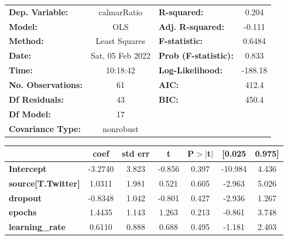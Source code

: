 \begin{center}
\begin{tabular}{lclc}
\toprule
\textbf{Dep. Variable:}                   &   calmarRatio    & \textbf{  R-squared:         } &     0.204   \\
\textbf{Model:}                           &       OLS        & \textbf{  Adj. R-squared:    } &    -0.111   \\
\textbf{Method:}                          &  Least Squares   & \textbf{  F-statistic:       } &    0.6484   \\
\textbf{Date:}                            & Sat, 05 Feb 2022 & \textbf{  Prob (F-statistic):} &    0.833    \\
\textbf{Time:}                            &     10:18:42     & \textbf{  Log-Likelihood:    } &   -188.18   \\
\textbf{No. Observations:}                &          61      & \textbf{  AIC:               } &     412.4   \\
\textbf{Df Residuals:}                    &          43      & \textbf{  BIC:               } &     450.4   \\
\textbf{Df Model:}                        &          17      & \textbf{                     } &             \\
\textbf{Covariance Type:}                 &    nonrobust     & \textbf{                     } &             \\
\bottomrule
\end{tabular}
\begin{tabular}{lcccccc}
                                          & \textbf{coef} & \textbf{std err} & \textbf{t} & \textbf{P$> |$t$|$} & \textbf{[0.025} & \textbf{0.975]}  \\
\midrule
\textbf{Intercept}                        &      -3.2740  &        3.823     &    -0.856  &         0.397        &      -10.984    &        4.436     \\
\textbf{source[T.Twitter]}                &       1.0311  &        1.981     &     0.521  &         0.605        &       -2.963    &        5.026     \\
\textbf{dropout}                          &      -0.8348  &        1.042     &    -0.801  &         0.427        &       -2.936    &        1.267     \\
\textbf{epochs}                           &       1.4435  &        1.143     &     1.263  &         0.213        &       -0.861    &        3.748     \\
\textbf{learning\_rate}                   &       0.6110  &        0.888     &     0.688  &         0.495        &       -1.181    &        2.403     \\

\end{tabular}
\end{center}
